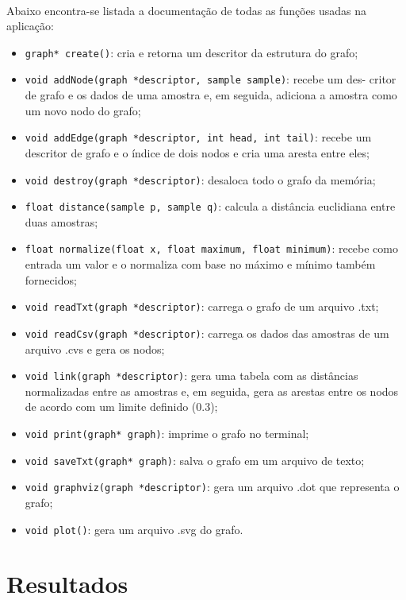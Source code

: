 \documentclass{article}
\begin{document}
		\paragraph{} Abaixo encontra-se listada a documentação de todas as funções usadas na aplicação:
        \begin{itemize}
			\item \texttt{graph* create()}: cria e retorna um descritor da estrutura do grafo;
			\item \texttt{void addNode(graph *descriptor, sample sample)}: recebe um des- critor de grafo e os dados de uma amostra e, em seguida, adiciona a amostra como um novo nodo do grafo;
			\item \texttt{void addEdge(graph *descriptor, int head, int tail)}: recebe um descritor de grafo e o índice de dois nodos e cria uma aresta entre eles;
			\item \texttt{void destroy(graph *descriptor)}: desaloca todo o grafo da memória;
			\item \texttt{float distance(sample p, sample q)}: calcula a distância euclidiana entre duas amostras;
			\item \texttt{float normalize(float x, float maximum, float minimum)}: recebe como entrada um valor e o normaliza com base no máximo e mínimo também fornecidos;
			\item \texttt{void readTxt(graph *descriptor)}: carrega o grafo de um arquivo .txt;
			\item \texttt{void readCsv(graph *descriptor)}: carrega os dados das amostras de um arquivo .cvs e gera os nodos;
			\item \texttt{void link(graph *descriptor)}: gera uma tabela com as distâncias normalizadas entre as amostras e, em seguida, gera as arestas entre os nodos de acordo com um limite definido (0.3);
			\item \texttt{void print(graph* graph)}: imprime o grafo no terminal;
			\item \texttt{void saveTxt(graph* graph)}: salva o grafo em um arquivo de texto;
			\item \texttt{void graphviz(graph *descriptor)}: gera um arquivo .dot que representa o grafo;
			\item \texttt{void plot()}: gera um arquivo .svg do grafo.
		\end{itemize}

    \section{Resultados}
\end{document}
